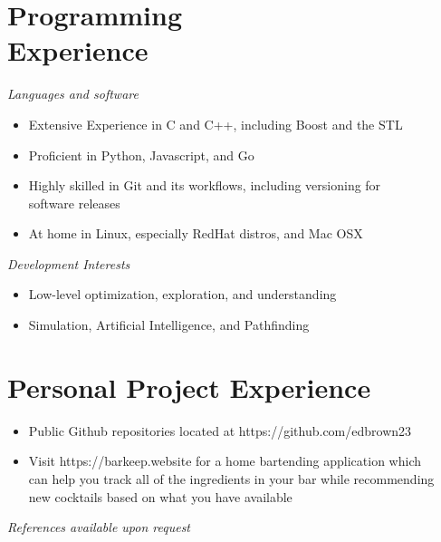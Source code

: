 \documentclass[line,margin]{res}
\begin{document}
\begin{resume}
    \section{Programming \\ Experience}
        {\sl Languages and software}
            \begin{itemize} \itemsep -2pt
                \item Extensive Experience in C and C++, including Boost and the STL
                \item Proficient in Python, Javascript, and Go
                \item Highly skilled in Git and its workflows, including versioning for \\
                      software releases
                \item At home in Linux, especially RedHat distros, and Mac OSX
            \end{itemize}
        {\sl Development Interests}
            \begin{itemize} \itemsep -2pt
                \item Low-level optimization, exploration, and understanding
                \item Simulation, Artificial Intelligence, and Pathfinding
            \end{itemize}
         
    \section{Personal Project Experience}
        \begin{itemize} \itemsep -2pt
            \item Public Github repositories located at https://github.com/edbrown23 
            \item Visit https://barkeep.website for a home bartending application which \\
                  can help you track all of the ingredients in your bar while recommending \\
                  new cocktails based on what you have available
        \end{itemize}
            
    {\sl References available upon request}
    \end{resume}
\end{document}
